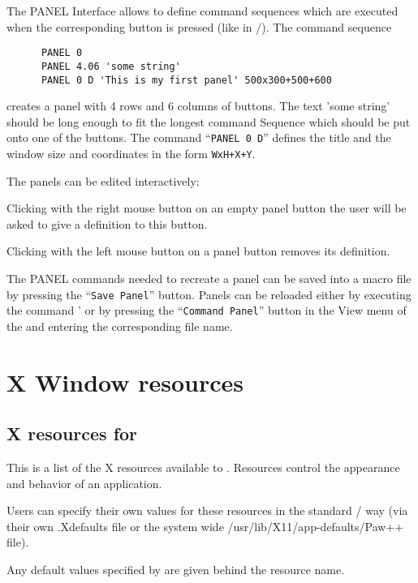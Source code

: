    The PANEL Interface allows to define command sequences which are executed
   when the corresponding button is pressed (like  in \XPAW/\Xxi).
   The command sequence

\begin{verbatim}
      PANEL 0
      PANEL 4.06 'some string'
      PANEL 0 D 'This is my first panel' 500x300+500+600
\end{verbatim}
   
   creates a panel with 4 rows and 6 columns of buttons.  The text
   'some string' should be long enough to fit the longest command
   Sequence which should be put onto one of the buttons.  The command
   ``\texttt{PANEL 0 D}'' defines the title and the window size and
   coordinates in the form \texttt{WxH+X+Y}.

   The panels can be edited interactively:
\begin{Itemize}
\item Clicking with the right mouse button on an empty panel button the user
   will be asked to give a definition to this button.
\item Clicking with the left mouse button on a panel button removes its
   definition.
\end{Itemize}
The PANEL commands needed to recreate a panel can be saved into a
macro file by pressing the ``\texttt{Save Panel}'' button.  Panels can
be reloaded either by executing the command ' or by
pressing the ``\texttt{Command Panel}'' button in the View menu of
the \EW{} and entering the corresponding file name.

\appendix
\chapter{X Window resources}
\section{X resources for \PAWPP}

   This is a list of the X resources available to \PAWPP.  Resources control
   the appearance and behavior of an application.

   Users can specify their own values for these resources in the standard
   \Xxi/\MOTIF{} way (via their own .Xdefaults file or the system wide
   /usr/lib/X11/app-defaults/Paw++ file).

   Any default values specified by \PAWPP{} are given behind the resource name.

